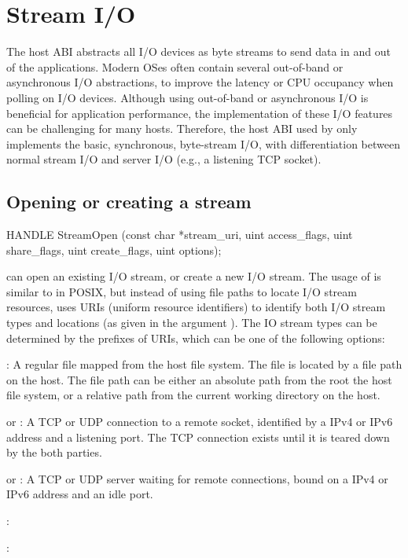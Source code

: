 \section{Stream I/O}
\label{sec:abi:streams}


The host ABI abstracts all I/O devices as byte streams to send data in and out of the applications.
Modern OSes often contain several out-of-band or asynchronous I/O abstractions, to improve the latency or CPU occupancy when polling on I/O devices.
Although using out-of-band or asynchronous I/O is beneficial for application performance, the implementation of these I/O features can be challenging for many hosts.
Therefore, the host ABI used by \graphene{} only implements the basic, synchronous, byte-stream I/O,
with differentiation between normal stream I/O and server I/O (e.g., a listening TCP socket).  

\subsection*{Opening or creating a stream}


\begin{paldef}
HANDLE StreamOpen (const char *stream_uri,
                   uint access_flags, uint share_flags,
                   uint create_flags, uint options);
\end{paldef}


 can open an existing I/O stream, or create a new I/O stream.
The usage of  is similar to  in POSIX,
but instead of using file paths to locate I/O stream resources,  uses URIs (uniform resource identifiers) to identify both I/O stream types and locations (as given in the argument ).
The IO stream types can be determined by the {\rm prefixes} of URIs, which can be one of the following options:

\begin{compactitem}
\item {}: A regular file mapped from the host file system. The file is located by a file path on the host. The file path can be either an absolute path from the root the host file system, or a relative path from the current working directory on the host.
\item {} or : A TCP or UDP connection to a remote socket, identified by a IPv4 or IPv6 address and a listening port. The TCP connection exists until it is teared down by the both parties.
\item {} or : A TCP or UDP server waiting for remote connections, bound on a IPv4 or IPv6 address and an idle port.
\item {}:
\item {}:
\end{compactitem}

